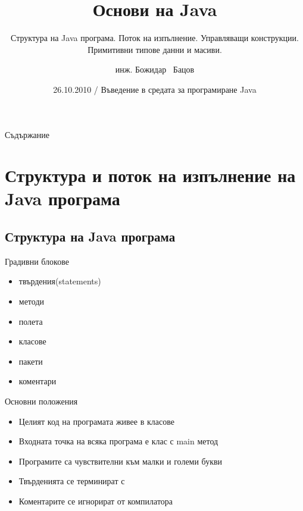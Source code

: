 \documentclass{beamer}
\title[Основи на Java] %
{Основи на Java}
\subtitle
{Структура на Java програма. Поток на изпълнение. Управляващи
  конструкции. Примитивни типове данни и масиви.} %
\author[инж. Божидар Бацов]{инж. Божидар ~Бацов}
\institute[Drow Ltd.]{Drow Ltd.}
\date[Java Begins]{26.10.2010 / Въведение в средата за програмиране Java}
\begin{document}

\begin{frame}
  \titlepage
\end{frame}

\begin{frame}{Съдържание}
  \tableofcontents
\end{frame}




\section{Структура и поток на изпълнение на Java програма}

\subsection{Структура на Java програма}

\begin{frame}{Градивни блокове}
  \begin{itemize}
  \item твърдения(statements)
  \item методи
  \item полета
  \item класове
  \item пакети
  \item коментари
  \end{itemize}
\end{frame}


\begin{frame}{Основни положения}  
  \begin{itemize}
    \item Целият код на програмата живее в класове
    \item Входната точка на всяка програма е клас с main метод
    \item Програмите са чувствителни към малки и големи букви
    \item Твърденията се терминират с
    \item Коментарите се игнорират от компилатора
  \end{itemize}
\end{frame}
\end{document}
